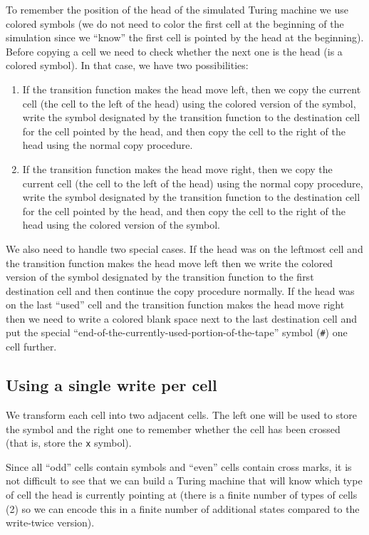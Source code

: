 \documentclass{article}
\begin{document}
To remember the position of the head of the simulated Turing machine we use
colored symbols (we do not need to color the first cell at the beginning of
the simulation since we ``know'' the first cell is pointed by the head at the
beginning).
Before copying a cell we need to check whether the next one is the head (is a
colored symbol).
In that case, we have two possibilities:
\begin{enumerate}
\item If the transition function makes the head move left, then
we copy the current cell (the cell to the left of the
head) using the colored version of the symbol, write the symbol designated by
the transition function to the destination cell for the
cell pointed by the head, and then copy the cell to the right of the head
using the normal copy procedure.
\item If the transition function makes the head move right, then
we copy the current cell (the cell to the left of the
head) using the normal copy procedure, write the symbol designated by
the transition function to the destination cell for the
cell pointed by the head, and then copy the cell to the right of the head
using the colored version of the symbol.
\end{enumerate}

We also need to handle two special cases.
If the head was on the leftmost cell and the transition function makes the
head move left then we write the colored version of the symbol designated by
the transition function to the first destination cell and then continue the
copy procedure normally.
If the head was on the last ``used'' cell and the transition function makes
the head move right then we need to write a colored blank space next to the
last destination
cell and put the special
``end-of-the-currently-used-portion-of-the-tape'' symbol (\texttt{\#})
one cell further.

\subsection*{Using a single write per cell}

We transform each cell into two adjacent cells. The left one will be used to
store the symbol and the right one to remember whether the cell has been
crossed (that is, store the \texttt{x} symbol).

Since all ``odd'' cells contain symbols and ``even'' cells contain cross marks,
it is not difficult to see that we can build a Turing machine that will know
which type of cell the head is currently pointing at (there is a finite number
of types of cells (2) so we can encode this in a finite number of additional
states compared to the write-twice version).
\end{document}
